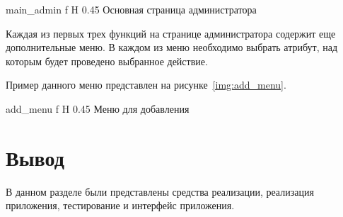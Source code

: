 {main_admin} %
{f} %
{H} %
{0.45\textwidth} %
{Основная страница администратора} %

Каждая из первых трех функций на странице администратора содержит еще дополнительные меню.
В каждом из меню необходимо выбрать атрибут, над которым будет проведено выбранное действие.

Пример данного меню представлен на рисунке~\ref{img:add_menu}.

{add_menu} %
{f} %
{H} %
{0.45\textwidth} %
{Меню для добавления} %


\section*{Вывод}
В данном разделе были представлены средства реализации, реализация приложения, тестирование и интерфейс приложения.
